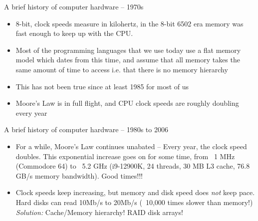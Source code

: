 \documentclass{beamer}
\begin{document}
\begin{frame}{A brief history of computer hardware -- 1970s}
	\begin{itemize}
		\item 8-bit, clock speeds measure in kilohertz, in the 8-bit 6502 era
		memory was fast enough to keep up with the CPU.
		\item Most of the programming
		languages that we use today use a flat memory model which dates from this time,
		and assume that all memory takes the same amount of time to access i.e. that there
		is no memory hierarchy
		\item This has
		not been true since at least 1985 for most of us
		\item Moore's Law is in full flight, and CPU clock speeds are roughly doubling every year
	\end{itemize}
\end{frame}

\begin{frame}{A brief history of computer hardware -- 1980s to 2006}
	\begin{itemize}
		\item For a while, Moore's Law continues unabated --
		Every year, the clock speed doubles.
		This exponential increase goes on for some time, from ~1 MHz (Commodore 64) to
		~5.2 GHz (i9-12900K, 24 threads, 30 MB L3 cache, 76.8 GB/s memory bandwidth). Good times!!!

		\item	Clock speeds keep increasing, but memory and disk speed does \emph{not} keep pace.
		Hard disks can read 10Mb/s to 20Mb/s (~10,000 times slower than memory!) \\
	\emph{Solution:} Cache/Memory hierarchy! RAID disk arrays!
	\end{itemize}
\end{frame}
\end{document}
